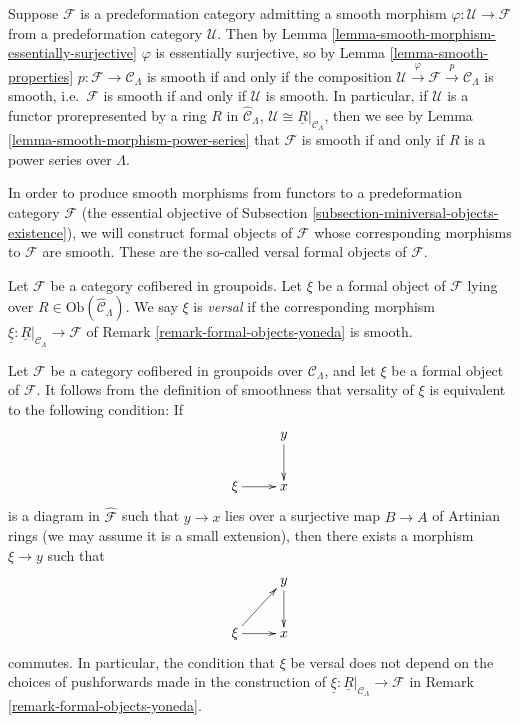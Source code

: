 \begin{remark}
\label{remark-smooth-on-top}
Suppose $\mathcal{F}$ is a predeformation category admitting a smooth morphism 
$\varphi: \mathcal U \to \mathcal{F}$ from a predeformation category 
$\mathcal U$.  Then by
Lemma \ref{lemma-smooth-morphism-essentially-surjective} 
$\varphi$ is essentially surjective, so by
Lemma \ref{lemma-smooth-properties} 
$p: \mathcal{F} \to \mathcal{C}_\Lambda$ is smooth if and only if the 
composition $\mathcal U \xrightarrow{\varphi} \mathcal{F} \xrightarrow{p} 
\mathcal{C}_\Lambda$ is smooth, i.e.\ $\mathcal{F}$ is smooth if and only if 
$\mathcal U$ is smooth.  In particular, if $\mathcal U$ is a functor 
prorepresented by a ring $R$ in $\widehat{\mathcal{C}}_\Lambda$, $\mathcal U 
\cong \underline{R}|_{\mathcal{C}_\Lambda}$, then we see by
Lemma \ref{lemma-smooth-morphism-power-series}
that $\mathcal{F}$ is smooth if and
only if $R$ is a power series over $\Lambda$.
\end{remark}

\noindent
In order to produce smooth morphisms from functors to a predeformation category 
$\mathcal{F}$ (the essential objective of
Subsection \ref{subsection-miniversal-objects-existence}),
we will construct formal 
objects of $\mathcal{F}$ whose corresponding morphisms to $\mathcal{F}$ are 
smooth.  These are the so-called versal formal objects of $\mathcal{F}$.

\begin{definition}
\label{definition-versal}
Let $\mathcal{F}$ be a category cofibered in groupoids.  Let $\xi$ be a formal 
object of $\mathcal{F}$ lying over $R \in \text{Ob}(\widehat{\mathcal 
C}_\Lambda)$.  We say $\xi$ is {\it versal} if the corresponding morphism 
$\underline{\xi}: \underline{R}|_{\mathcal{C}_\Lambda} \to \mathcal{F}$ 
of Remark \ref{remark-formal-objects-yoneda} is smooth.
\end{definition}

\begin{remark}
\label{remark-versal-object}
Let $\mathcal{F}$ be a category cofibered in groupoids over $\mathcal 
C_\Lambda$, and let $\xi$ be a formal object of $\mathcal{F}$.  It follows 
from the definition of smoothness that versality of $\xi$ is equivalent to the 
following condition: If 
\[
\xymatrix{
            &  y \ar[d] \\
\xi \ar[r]  &  x
}
\]
is a diagram in $\widehat{\mathcal{F}}$ such that $y \to x$ lies over a 
surjective map $B \to A$ of Artinian rings (we may assume it is a small 
extension),  then there exists a morphism $\xi \to y$ such that
\[
\xymatrix{
            &  y \ar[d] \\
\xi \ar[r] \ar[ur]  &  x
}
\] 
commutes. In particular, the condition that $\xi$ be versal does not depend on 
the choices of pushforwards made in the construction of $\underline{\xi}: 
\underline{R}|_{\mathcal{C}_\Lambda} \to \mathcal{F}$ in Remark 
\ref{remark-formal-objects-yoneda}.
\end{remark}

